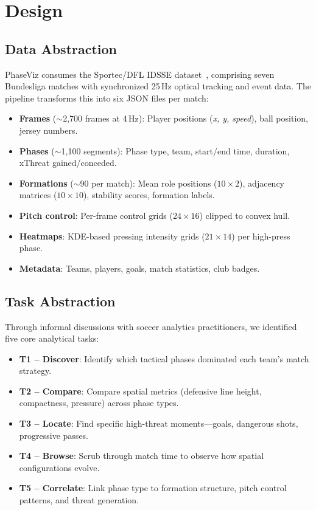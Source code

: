 \documentclass{vgtc}                          %
\begin{document}
\section{Design}

\subsection{Data Abstraction}

PhaseViz consumes the Sportec/DFL IDSSE dataset~\cite{bassek2025}, comprising seven Bundesliga matches with synchronized 25\,Hz optical tracking and event data. The pipeline transforms this into six JSON files per match:

\begin{itemize}
  \item \textbf{Frames} (${\sim}$2,700 frames at 4\,Hz): Player positions (\emph{x, y, speed}), ball position, jersey numbers.
  \item \textbf{Phases} (${\sim}$1,100 segments): Phase type, team, start/end time, duration, xThreat gained/conceded.
  \item \textbf{Formations} (${\sim}$90 per match): Mean role positions ($10{\times}2$), adjacency matrices ($10{\times}10$), stability scores, formation labels.
  \item \textbf{Pitch control}: Per-frame control grids ($24{\times}16$) clipped to convex hull.
  \item \textbf{Heatmaps}: KDE-based pressing intensity grids ($21{\times}14$) per high-press phase.
  \item \textbf{Metadata}: Teams, players, goals, match statistics, club badges.
\end{itemize}

\subsection{Task Abstraction}

Through informal discussions with soccer analytics practitioners, we identified five core analytical tasks:

\begin{itemize}
  \item \textbf{T1 -- Discover}: Identify which tactical phases dominated each team's match strategy.
  \item \textbf{T2 -- Compare}: Compare spatial metrics (defensive line height, compactness, pressure) across phase types.
  \item \textbf{T3 -- Locate}: Find specific high-threat moments---goals, dangerous shots, progressive passes.
  \item \textbf{T4 -- Browse}: Scrub through match time to observe how spatial configurations evolve.
  \item \textbf{T5 -- Correlate}: Link phase type to formation structure, pitch control patterns, and threat generation.
\end{itemize}
\end{document}

